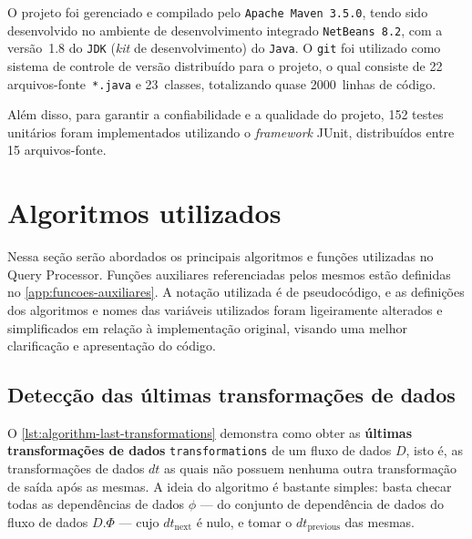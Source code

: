 O projeto foi gerenciado e compilado pelo \texttt{Apache Maven~3.5.0}, tendo sido desenvolvido no ambiente de desenvolvimento integrado \texttt{NetBeans~8.2}, com a versão~1.8 do \texttt{JDK} (\textit{kit} de desenvolvimento) do \texttt{Java}. O \texttt{git} foi utilizado como sistema de controle de versão distribuído para o projeto, o qual consiste de
22 arquivos-fonte~\texttt{*.java} e 23~classes, totalizando quase 2000~linhas de código.

Além disso, para garantir a confiabilidade e a qualidade do projeto, 152 testes unitários foram implementados utilizando o \textit{framework} JUnit, distribuídos entre 15 arquivos-fonte.

\section{Algoritmos utilizados}%
\label{sec:algoritmos-utilizados}

Nessa seção serão abordados os principais algoritmos e funções utilizadas no Query Processor. Funções auxiliares referenciadas pelos mesmos estão definidas no \autoref{app:funcoes-auxiliares}. A notação utilizada é de pseudocódigo, e as definições dos algoritmos e nomes das variáveis utilizados foram ligeiramente alterados e simplificados em relação à implementação original, visando uma melhor clarificação e apresentação do código.


\subsection{Detecção das últimas transformações de dados}

O \autoref{lst:algorithm-last-transformations} demonstra como obter as \textbf{últimas transformações de dados} \texttt{transformations} de um fluxo de dados \( D \), isto é, as transformações de dados \(dt\) as quais não possuem nenhuma outra transformação de saída após as mesmas. A ideia do algoritmo é bastante simples: basta checar todas as dependências de dados \( \phi \) --- do conjunto de dependência de dados do fluxo de dados \( D.\Phi \) --- cujo \( dt_{\textrm{next}} \) é nulo, e tomar o \( dt_{\textrm{previous}} \) das mesmas.

